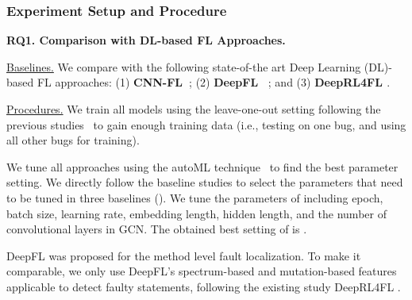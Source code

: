 \subsubsection{Experiment Setup and Procedure}
\hspace{1cm}

{\bf RQ1. Comparison with DL-based FL Approaches.}

\underline{Baselines.} We compare {\tool} with the following state-of-the art Deep Learning (DL)-based FL approaches: (1) \textbf{CNN-FL~\cite{zhang2019cnn}}; (2) {\bf DeepFL~\cite{DeepFL}} ; and (3) {\bf DeepRL4FL \cite{li2021fault}}.


\underline{Procedures.}
We train all models using the leave-one-out setting following the
previous studies~\cite{DeepFL, TraPT} to gain enough training data
(i.e., testing on one bug, and using all other bugs for
training).



We tune all approaches using the autoML technique~\cite{NNI} to find the best parameter setting. 
We directly follow the baseline studies to select the parameters that need to be tuned in three baselines ({\color{red}{you do not need to specify the parameters for baselines? you let autoML to select parameters?}}). We tune the parameters of {\tool} including epoch, batch size, learning rate, embedding length, hidden length, and the number of convolutional layers in GCN. The obtained best setting of {\tool} is {\color{red}{xxxxxx}}.

DeepFL was proposed for the method level fault localization. 
To make it comparable, we only use DeepFL's spectrum-based and mutation-based features applicable to detect faulty statements, following the existing study DeepRL4FL \cite{li2021fault}. 

